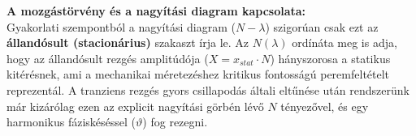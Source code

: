 \textbf{A mozgástörvény és a nagyítási diagram kapcsolata:} \\
Gyakorlati szempontból a nagyítási diagram ($N-\lambda$) szigorúan csak ezt az \textbf{állandósult (stacionárius)} szakaszt írja le. Az $N(\lambda)$ ordínáta meg is adja, hogy az állandósult rezgés amplitúdója ($X = x_{stat} \cdot N$) hányszorosa a statikus kitérésnek, ami a mechanikai méretezéshez kritikus fontosságú peremfeltételt reprezentál. A tranziens rezgés gyors csillapodás általi eltűnése után rendszerünk már kizárólag ezen az explicit nagyítási görbén lévő $N$ tényezővel, és egy harmonikus fáziskéséssel ($\vartheta$) fog rezegni.
